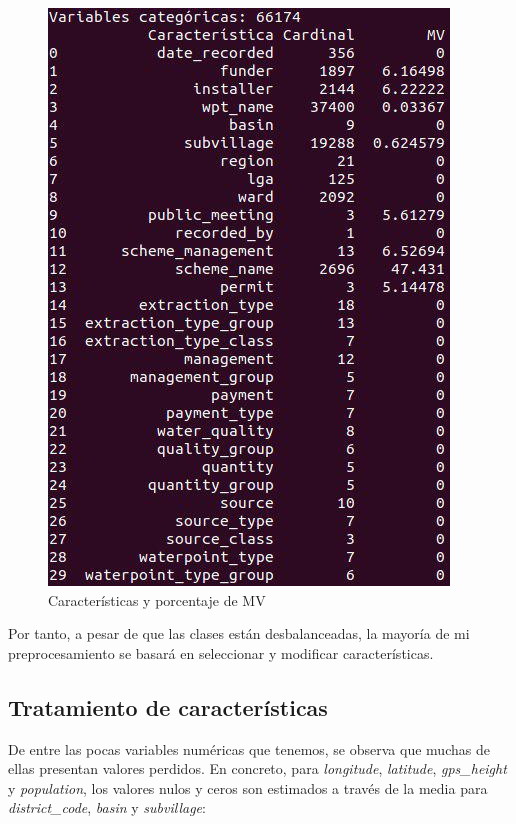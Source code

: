 \begin{figure}[H] %
	\centering
	\includegraphics[scale=0.5]{categoricas.jpg}  %
	\caption{Características y porcentaje de MV} 
	\label{fig:cat}
\end{figure}

Por tanto, a pesar de que las clases están desbalanceadas, la mayoría de mi preprocesamiento se basará en seleccionar y modificar características.

\subsection{Tratamiento de características}

De entre las pocas variables numéricas que tenemos, se observa que muchas de ellas presentan valores perdidos. En concreto, para \textit{longitude}, \textit{latitude}, \textit{gps\_height} y \textit{population}, los valores nulos y ceros son estimados a través de la media para \textit{district\_code}, \textit{basin} y \textit{subvillage}:

